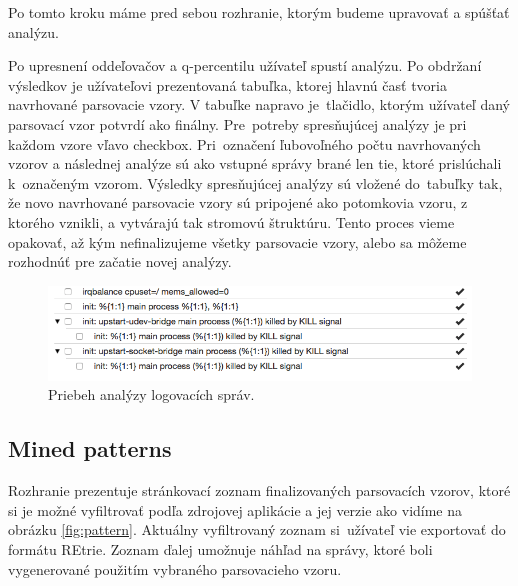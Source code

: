 Po tomto kroku máme pred sebou rozhranie, ktorým budeme upravovať a spúšťať analýzu.
\par Po upresnení oddeľovačov a q-percentilu užívateľ spustí analýzu. Po obdržaní výsledkov je užívateľovi prezentovaná tabuľka, ktorej hlavnú časť tvoria navrhované parsovacie vzory. V tabuľke napravo je~tlačidlo, ktorým užívateľ daný parsovací vzor potvrdí ako finálny. Pre~potreby spresňujúcej analýzy je pri každom vzore vľavo checkbox. Pri~označení ľubovoľného počtu navrhovaných vzorov a následnej analýze sú ako vstupné správy brané len tie, ktoré prislúchali k~označeným vzorom. Výsledky spresňujúcej analýzy sú vložené do~tabuľky tak, že novo navrhované parsovacie vzory sú pripojené ako potomkovia vzoru, z ktorého vznikli, a vytvárajú tak stromovú štruktúru. Tento proces vieme opakovať, až kým nefinalizujeme všetky parsovacie vzory, alebo sa môžeme rozhodnúť pre začatie novej analýzy.

\begin{figure}[htbp]
 \centering 
 \begin{minipage}{0.95\linewidth}
 	\centering
 	\includegraphics[width=\textwidth]{Images/thesis-miner-analysis.png}
 \end{minipage}
  \caption{Priebeh analýzy logovacích správ.}
  \label{fig:miner-source}
\end{figure}

\subsection{Mined patterns}
Rozhranie prezentuje stránkovací zoznam finalizovaných parsovacích vzorov, ktoré si je možné vyfiltrovať podľa zdrojovej aplikácie a jej verzie ako vidíme na obrázku \ref{fig:pattern}. Aktuálny vyfiltrovaný zoznam si~užívateľ vie exportovať do formátu REtrie. Zoznam ďalej umožnuje náhľad na správy, ktoré boli vygenerované použitím vybraného parsovacieho vzoru.


